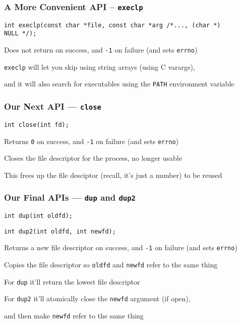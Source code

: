   \begin{frame}
    \frametitle{A More Convenient API -- \texttt{execlp}}

    \lstinline!int execlp(const char *file, const char *arg /*..., (char *)
                          NULL */);!

    \vspace{2em}

    Does not return on success, and \texttt{-1} on failure
    (and sets \texttt{errno})

    \vspace{2em}

    \texttt{execlp} will let you skip using string arrays (using C varargs),
    
    and it will also search for executables using the \texttt{PATH} environment
    variable
  \end{frame}

  \begin{frame}
    \frametitle{Our Next API --- \texttt{close}}

    \lstinline!int close(int fd);!

    \vspace{2em}

    Returns \texttt{0} on success, and \texttt{-1} on failure
    (and sets \texttt{errno})

    \vspace{2em}

    Closes the file descriptor for the process, no longer usable

    \vspace{2em}

    This frees up the file desciptor (recall, it's just a number) to be reused
  \end{frame}

  \begin{frame}
    \frametitle{Our Final APIs --- \texttt{dup} and \texttt{dup2}}

    \lstinline!int dup(int oldfd);!

    \lstinline!int dup2(int oldfd, int newfd);!

    \vspace{2em}

    Returns a new file descriptor on success, and \texttt{-1} on failure
    (and sets \texttt{errno})

    \vspace{2em}

    Copies the file descriptor so \texttt{oldfd} and \texttt{newfd} refer to
    the same thing

    \vspace{2em}

    For \texttt{dup} it'll return the lowest file descriptor

    \vspace{2em}

    For \texttt{dup2} it'll atomically close the \texttt{newfd} argument
    (if open),
    
    and then make \texttt{newfd} refer to the same thing
  \end{frame}

